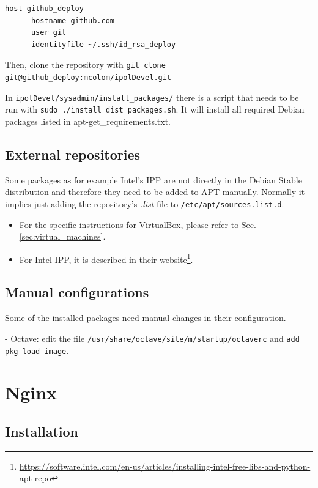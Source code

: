 \documentclass[a4paper,12pt]{article}
\begin{document}
\begin{verbatim}
host github_deploy
      hostname github.com
      user git
      identityfile ~/.ssh/id_rsa_deploy
\end{verbatim}

Then, clone the repository with {\tt git clone git@github\_deploy:mcolom/ipolDevel.git}

In {\tt ipolDevel/sysadmin/install\_packages/} there is a script that needs to be run with {\tt sudo ./install\_dist\_packages.sh}. It will install all required Debian packages listed in apt-get\_requirements.txt.

\subsection{External repositories}
Some packages as for example Intel's IPP are not directly in the Debian Stable distribution and therefore they need to be added to APT manually. Normally it implies just adding the repository's \emph{.list} file to {\tt /etc/apt/sources.list.d}.

\begin{itemize}
    \item For the specific instructions for VirtualBox, please refer to Sec. \ref{sec:virtual_machines}.
    \item For Intel IPP, it is described in their website\footnote{\url{https://software.intel.com/en-us/articles/installing-intel-free-libs-and-python-apt-repo}}.
\end{itemize}


\subsection{Manual configurations}
Some of the installed packages need manual changes in their configuration.

- Octave: edit the file {\tt /usr/share/octave/site/m/startup/octaverc} and {\tt add pkg load image}.


\section{Nginx}

\subsection{Installation}
\end{document}
